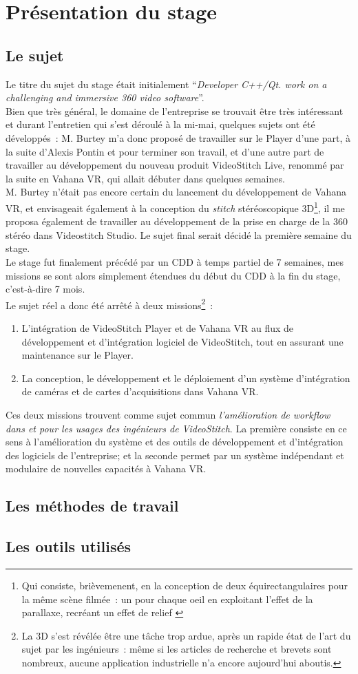 \chapter{Présentation du stage}

\section{Le sujet}
Le titre du sujet du stage était initialement \enquote{\textit{Developer C++/Qt.
work on a challenging and immersive 360 video software}}.\\
Bien que très général, le domaine de l'entreprise se trouvait être très intéressant
et durant l'entretien qui s'est déroulé à la mi-mai, quelques sujets ont été
développés~: M. Burtey m'a donc proposé de travailler sur le Player d'une part,
à la suite d'Alexis Pontin et pour terminer son travail, et d'une autre part de
travailler au développement du nouveau produit VideoStitch Live, renommé par la
suite en Vahana VR, qui allait débuter dans quelques semaines.\\
M. Burtey n'était pas encore certain du lancement du développement de Vahana VR, 
et envisageait également à la conception du \textit{stitch} stéréoscopique 3D\footnote{Qui
consiste, brièvemenent, en la conception de deux équirectangulaires pour la même
scène filmée~: un pour chaque oeil en exploitant l'effet de la parallaxe, recréant 
un effet de relief\cite{videostitch-stereo}
\cite{image-stereoscopique}}, il me proposa également de travailler au développement
de la prise en charge de la 360 stéréo dans Videostitch Studio. Le sujet final serait
décidé la première semaine du stage.\\
\newline
Le stage fut finalement précédé par un CDD à temps partiel de 7 semaines, mes missions
se sont alors simplement étendues du début du CDD à la fin du stage, c'est-à-dire 
7 mois.\\
Le sujet réel a donc été arrêté à deux missions\footnote{La 3D s'est révélée être 
une tâche trop ardue, après un rapide état de l'art du sujet par les ingénieurs~: 
même si les articles de recherche et brevets sont nombreux, aucune application 
industrielle n'a encore aujourd'hui aboutis.}~:
\begin{enumerate}
\item L'intégration de VideoStitch Player et de Vahana VR au flux de développement et d'intégration
logiciel de VideoStitch, tout en assurant une maintenance sur le Player.
\item La conception, le développement et le déploiement d'un système
d'intégration de caméras et de cartes d'acquisitions dans Vahana VR.
\end{enumerate}
Ces deux missions trouvent comme sujet commun \emph{l'amélioration de \textit{workflow}
dans et pour les usages des ingénieurs de VideoStitch}. La première consiste en 
ce sens à l'amélioration du système et des outils de développement et d'intégration des logiciels
de l'entreprise; et la seconde permet par un système indépendant et modulaire de
nouvelles capacités à Vahana VR.

\section{Les méthodes de travail}

\section{Les outils utilisés}
